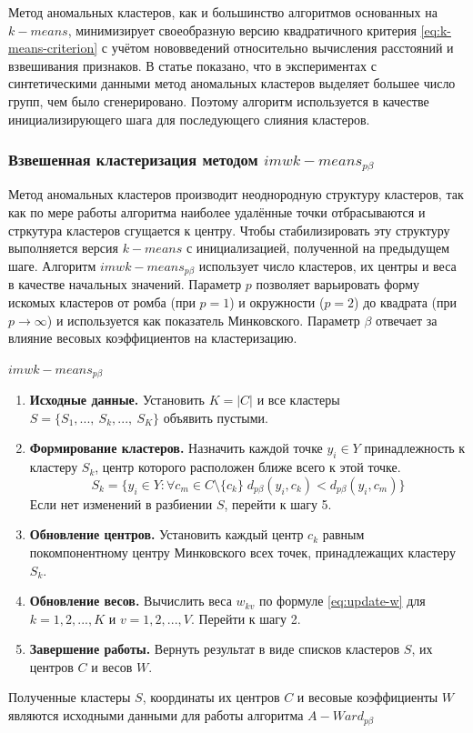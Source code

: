 \documentclass[12pt,twoside,a4paper,tikz,border=5]{refart}
\begin{document}
				Метод аномальных кластеров, как и большинство алгоритмов основанных на $ k-means $, минимизирует своеобразную версию квадратичного критерия \eqref{eq:k-means-criterion} с учётом нововведений относительно вычисления расстояний и взвешивания признаков. В статье \cite{a-ward-pb} показано, что в экспериментах с синтетическими данными метод аномальных кластеров выделяет большее число групп, чем было сгенерировано. Поэтому алгоритм используется в качестве инициализирующего шага для последующего слияния кластеров.	
			\subsubsection{Взвешенная кластеризация методом $ imwk-means_{p\beta} $}
				Метод аномальных кластеров производит неоднородную структуру кластеров, так как по мере работы алгоритма наиболее удалённые точки отбрасываются и стркутура кластеров сгущается к центру. Чтобы стабилизировать эту структуру выполняется версия $ k-means $ с инициализацией, полученной на предыдущем шаге. Алгоритм $ imwk-means_{p\beta} $ использует число кластеров, их центры и веса в качестве начальных значений. Параметр $ p $ позволяет варьировать форму искомых кластеров от ромба (при $ p=1 $) и окружности ($ p=2 $) до квадрата  (при $ p\rightarrow \infty $) и используется как показатель Минковского. Параметр $ \beta $ отвечает за влияние весовых коэффициентов на кластеризацию.
				\begin{algorithm}{\boldmath$ imwk-means_{p\beta} $ }{}
					\begin{enumerate}
						\item \textbf{Исходные данные.} Установить $ K= |C|$ и все кластеры $ S=\{S_1,...,\:S_k,...,\:S_K\} $ объявить пустыми.
						\item \textbf{Формирование кластеров.} Назначить каждой точке $ y_i \in Y $ принадлежность к кластеру $ S_k $, центр которого расположен ближе всего к этой точке. 
						\begin{equation}
							S_k =\{y_i \in Y:  \forall c_m \in C \setminus \{c_k\}\; d_{p\beta}(y_i,c_k)<d_{p\beta}(y_i,c_m)\}
						\end{equation}
						Если нет изменений в разбиении $ S $, перейти к шагу 5.
						\item  \textbf{Обновление центров.} Установить каждый центр $ c_k $ равным покомпонентному центру Минковского всех точек, принадлежащих кластеру $ S_k $.
						\item \textbf{Обновление весов.} Вычислить веса $ w_{kv} $ по формуле \eqref{eq:update-w} для $ k=1,2,...,K $ и $ v=1,2,...,V $. Перейти к шагу 2.
						\item \textbf{Завершение работы.} Вернуть результат в виде списков кластеров $ S $, их центров $ C $ и весов $ W $.
					\end{enumerate}
				\end{algorithm}
				Полученные кластеры $ S $, координаты их центров $ C $ и весовые коэффициенты $ W $ являются исходными данными для работы алгоритма $ A-Ward_{p\beta} $
				\newpage
\end{document}
